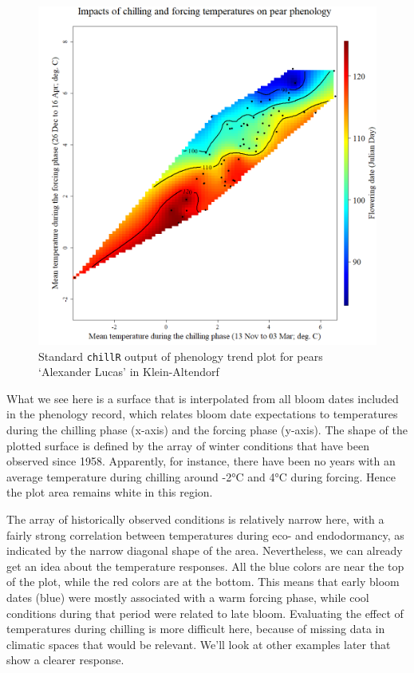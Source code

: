 \documentclass[
]{book}
\begin{document}
\begin{figure}
\centering
\includegraphics{pictures/pheno_trend_plot.png}
\caption{Standard \texttt{chillR} output of phenology trend plot for pears `Alexander Lucas' in Klein-Altendorf}
\end{figure}

What we see here is a surface that is interpolated from all bloom dates included in the phenology record, which relates bloom date expectations to temperatures during the chilling phase (x-axis) and the forcing phase (y-axis). The shape of the plotted surface is defined by the array of winter conditions that have been observed since 1958. Apparently, for instance, there have been no years with an average temperature during chilling around -2°C and 4°C during forcing. Hence the plot area remains white in this region.

The array of historically observed conditions is relatively narrow here, with a fairly strong correlation between temperatures during eco- and endodormancy, as indicated by the narrow diagonal shape of the area. Nevertheless, we can already get an idea about the temperature responses. All the blue colors are near the top of the plot, while the red colors are at the bottom. This means that early bloom dates (blue) were mostly associated with a warm forcing phase, while cool conditions during that period were related to late bloom. Evaluating the effect of temperatures during chilling is more difficult here, because of missing data in climatic spaces that would be relevant. We'll look at other examples later that show a clearer response.
\end{document}
